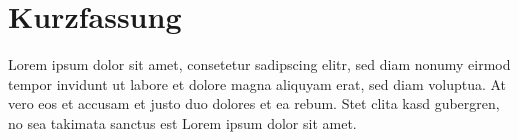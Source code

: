 \chapter*{Kurzfassung}

Lorem ipsum dolor sit amet, consetetur sadipscing elitr, sed diam nonumy eirmod tempor invidunt ut 
labore et dolore magna aliquyam erat, sed diam voluptua. At vero eos et accusam et justo duo dolores 
et ea rebum. Stet clita kasd gubergren, no sea takimata sanctus est Lorem ipsum dolor sit amet.